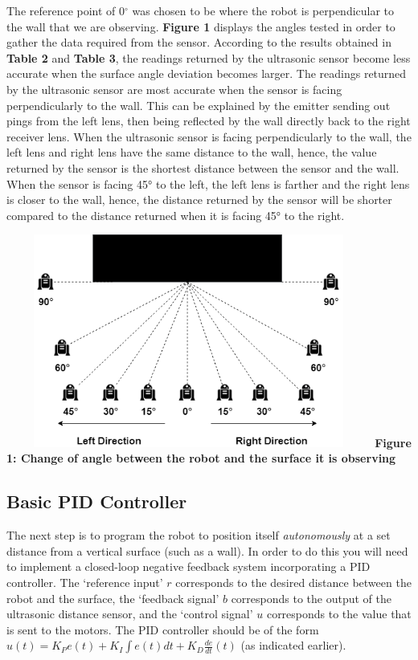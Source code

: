 \documentclass[hidelinks,a4paper,11pt]{article}
\begin{document}
\begin{mdframed}
\begin{enumerate}[label=(\roman*)]
The reference point of 0$^{\circ}$ was chosen to be where the robot is perpendicular to the wall
that we are observing. \textbf{Figure 1} displays the angles tested in order to gather the data
required from the sensor. According to the results obtained in \textbf{Table 2} and \textbf{Table
3}, the readings returned by the ultrasonic sensor become less accurate when the surface angle
deviation becomes larger. The readings returned by the ultrasonic sensor are most accurate when the
sensor is facing perpendicularly to the wall. This can be explained by the emitter sending out pings
from the left lens, then being reflected by the wall directly back to the right receiver lens. When
the ultrasonic sensor is facing perpendicularly to the wall, the left lens and right lens have the
same distance to the wall, hence, the value returned by the sensor is the shortest distance between
the sensor and the wall. When the sensor is facing \ang{45} to the left, the left lens is farther
and the right lens is closer to the wall, hence, the distance returned by the sensor will be shorter
compared to the distance returned when it is facing \ang{45} to the right.

\begin{center}
\includegraphics[width=12cm, height=7cm]{Degrees.png}
\textbf{Figure 1: Change of angle between the robot and the surface it is observing}
\end{center}
\end{enumerate}
\end{mdframed}
\vspace*{\baselineskip}

\subsection{Basic PID Controller}

The next step is to program the robot to position itself \emph{autonomously} at a set distance from
a vertical surface (such as a wall).  In order to do this you will need to implement a closed-loop
negative feedback system incorporating a PID controller.  The `reference input' $r$ corresponds to
the desired distance between the robot and the surface, the `feedback signal' $b$ corresponds to the
output of the ultrasonic distance sensor, and the `control signal' $u$ corresponds to the value that
is sent to the motors.  The PID controller should be of the form $u(t) = K_P e(t) + K_I \int e(t)dt
+ K_D \frac{de}{dt}(t)$ (as indicated earlier).
\end{document}
